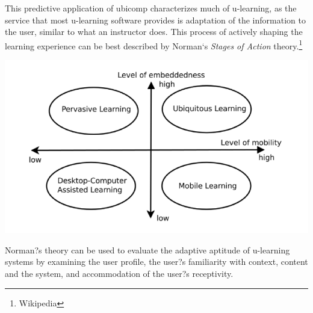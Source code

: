 \documentclass[twoside]{article}
\begin{document}
\begin{multicols}{2}
\setlength\parindent{24pt}This predictive application of ubicomp characterizes much of u-learning, as the service that most u-learning software provides is adaptation of the information to the user, similar to what an instructor does. This process of actively shaping the learning experience can be best described by Norman`s \emph{Stages of Action} theory.\footnote{Wikipedia} 
\begin{flushleft}
\includegraphics[scale=0.25,left]{2} 
\end{flushleft} 
Norman?s theory can be used to evaluate the adaptive aptitude of u-learning systems by examining the user profile, the user?s familiarity with context, content and the system, and accommodation of the user?s receptivity.


\end{multicols}
\end{document}
